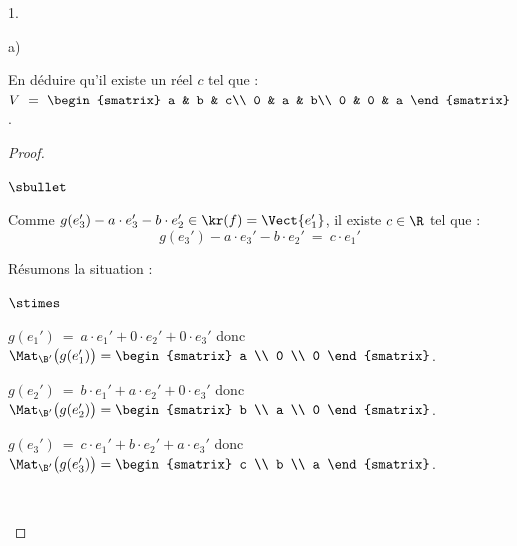 \documentclass[11pt]{article}%
\begin{document}
\begin{noliste}{1.}
\begin{noliste}{a)}
  \item En déduire qu'il existe un réel $c$ tel que : $V \ = \
    \begin{smatrix}
      a & b & c\\
      0 & a & b\\
      0 & 0 & a
    \end{smatrix}$.

    \begin{proof}~%
      \begin{noliste}{$\sbullet$}
      \item Comme $g(e_3') - a \cdot e_3' - b \cdot
          e_2' \in \kr(f) = \Vect{e_1'}$, il existe $c \in \R$ tel que
          : 
          \[
          g(e_3') - a \cdot e_3' - b \cdot e_2' \ = \ c \cdot e_1'
          \]

      \item Résumons la situation :
        \begin{noliste}{$\stimes$}
        \item $g(e_1') \ = \ a \cdot e_1' + 0 \cdot e_2' + 0 \cdot
          e_3'$ donc $\Mat_{\B'}\big( g(e_1') \big) =
          \begin{smatrix}
            a \\
            0 \\
            0
          \end{smatrix}
          $.

        \item $g(e_2') \ = \ b \cdot e_1' + a \cdot e_2' + 0 \cdot
          e_3'$ donc $\Mat_{\B'}\big( g(e_2') \big) =
          \begin{smatrix}
            b \\
            a \\
            0
          \end{smatrix}
          $.

        \item $g(e_3') \ = \ c \cdot e_1' + b \cdot e_2' + a \cdot
          e_3'$ donc $\Mat_{\B'}\big( g(e_3') \big) =
          \begin{smatrix}
            c \\
            b \\
            a
          \end{smatrix}
          $.          
        \end{noliste}
        ~\\[-1.5cm]
      \end{noliste}
    \end{proof}
  \end{noliste}


\end{noliste}
\end{document}
